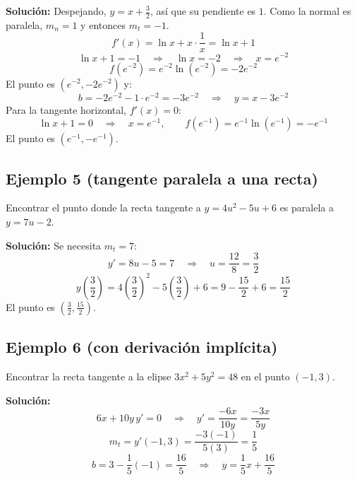 \documentclass[12pt]{article}
\begin{document}
\textbf{Solución:} Despejando, $y = x + \frac{3}{2}$, así que su pendiente es $1$. Como la normal es paralela, $m_n = 1$ y entonces $m_t = -1$.
\[
f'(x) = \ln x + x \cdot \frac{1}{x} = \ln x + 1
\]
\[
\ln x + 1 = -1 \quad \Rightarrow \quad \ln x = -2 \quad \Rightarrow \quad x = e^{-2}
\]
\[
f(e^{-2}) = e^{-2} \ln(e^{-2}) = -2e^{-2}
\]
El punto es $(e^{-2}, -2e^{-2})$ y:
\[
b = -2e^{-2} - 1 \cdot e^{-2} = -3e^{-2} \quad \Rightarrow \quad y = x - 3e^{-2}
\]
Para la tangente horizontal, $f'(x) = 0$:
\[
\ln x + 1 = 0 \quad \Rightarrow \quad x = e^{-1}, \qquad f(e^{-1}) = e^{-1}\ln(e^{-1}) = -e^{-1}
\]
El punto es $(e^{-1}, -e^{-1})$.

\subsection{Ejemplo 5 (tangente paralela a una recta)}
Encontrar el punto donde la recta tangente a $y = 4u^2 - 5u + 6$ es paralela a $y = 7u - 2$.

\textbf{Solución:} Se necesita $m_t = 7$:
\[
y' = 8u - 5 = 7 \quad \Rightarrow \quad u = \frac{12}{8} = \frac{3}{2}
\]
\[
y\left(\frac{3}{2}\right) = 4\left(\frac{3}{2}\right)^2 - 5\left(\frac{3}{2}\right) + 6 = 9 - \frac{15}{2} + 6 = \frac{15}{2}
\]
El punto es $\left(\frac{3}{2}, \frac{15}{2}\right)$.

\subsection{Ejemplo 6 (con derivación implícita)}
Encontrar la recta tangente a la elipse $3x^2 + 5y^2 = 48$ en el punto $(-1, 3)$.

\textbf{Solución:}
\[
6x + 10y\,y' = 0 \quad \Rightarrow \quad y' = \frac{-6x}{10y} = \frac{-3x}{5y}
\]
\[
m_t = y'(-1, 3) = \frac{-3(-1)}{5(3)} = \frac{1}{5}
\]
\[
b = 3 - \frac{1}{5}(-1) = \frac{16}{5} \quad \Rightarrow \quad y = \frac{1}{5}x + \frac{16}{5}
\]
\end{document}
